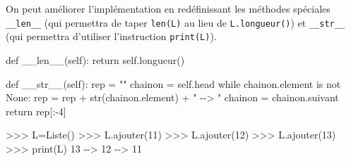 \documentclass[
  letterpaper,
  DIV=11,
  numbers=noendperiod]{scrartcl}
\newenvironment{Shaded}{\begin{snugshade}}{\end{snugshade}}
\newcommand{\BuiltInTok}[1]{\textcolor[rgb]{0.00,0.23,0.31}{#1}}
\newcommand{\ControlFlowTok}[1]{\textcolor[rgb]{0.00,0.23,0.31}{#1}}
\newcommand{\DecValTok}[1]{\textcolor[rgb]{0.68,0.00,0.00}{#1}}
\newcommand{\FunctionTok}[1]{\textcolor[rgb]{0.28,0.35,0.67}{#1}}
\newcommand{\KeywordTok}[1]{\textcolor[rgb]{0.00,0.23,0.31}{#1}}
\newcommand{\NormalTok}[1]{\textcolor[rgb]{0.00,0.23,0.31}{#1}}
\newcommand{\OperatorTok}[1]{\textcolor[rgb]{0.37,0.37,0.37}{#1}}
\newcommand{\StringTok}[1]{\textcolor[rgb]{0.13,0.47,0.30}{#1}}
\newcommand{\VariableTok}[1]{\textcolor[rgb]{0.07,0.07,0.07}{#1}}
\begin{document}
On peut améliorer l'implémentation en redéfinissant les méthodes
spéciales \texttt{\_\_len\_\_} (qui permettra de taper \texttt{len(L)}
au lieu de \texttt{L.longueur()}) et \texttt{\_\_str\_\_} (qui permettra
d'utiliser l'instruction \texttt{print(L)}).

\begin{Shaded}
\begin{Highlighting}[]
    \KeywordTok{def} \FunctionTok{\_\_len\_\_}\NormalTok{(}\VariableTok{self}\NormalTok{):}
        \ControlFlowTok{return} \VariableTok{self}\NormalTok{.longueur()}

    \KeywordTok{def} \FunctionTok{\_\_str\_\_}\NormalTok{(}\VariableTok{self}\NormalTok{):}
\NormalTok{        rep }\OperatorTok{=} \StringTok{""}
\NormalTok{        chainon }\OperatorTok{=} \VariableTok{self}\NormalTok{.head}
        \ControlFlowTok{while}\NormalTok{ chainon.element }\KeywordTok{is} \KeywordTok{not} \VariableTok{None}\NormalTok{:}
\NormalTok{            rep }\OperatorTok{=}\NormalTok{ rep }\OperatorTok{+} \BuiltInTok{str}\NormalTok{(chainon.element) }\OperatorTok{+} \StringTok{" {-}{-}\textgreater{} "}
\NormalTok{            chainon }\OperatorTok{=}\NormalTok{ chainon.suivant}
        \ControlFlowTok{return}\NormalTok{ rep[:}\OperatorTok{{-}}\DecValTok{4}\NormalTok{]}
\end{Highlighting}
\end{Shaded}

\begin{Shaded}
\begin{Highlighting}[]
\OperatorTok{\textgreater{}\textgreater{}\textgreater{}}\NormalTok{ L}\OperatorTok{=}\NormalTok{Liste()}
\OperatorTok{\textgreater{}\textgreater{}\textgreater{}}\NormalTok{ L.ajouter(}\DecValTok{11}\NormalTok{)}
\OperatorTok{\textgreater{}\textgreater{}\textgreater{}}\NormalTok{ L.ajouter(}\DecValTok{12}\NormalTok{)}
\OperatorTok{\textgreater{}\textgreater{}\textgreater{}}\NormalTok{ L.ajouter(}\DecValTok{13}\NormalTok{)}
\OperatorTok{\textgreater{}\textgreater{}\textgreater{}} \BuiltInTok{print}\NormalTok{(L)}
\DecValTok{13} \OperatorTok{{-}{-}\textgreater{}} \DecValTok{12} \OperatorTok{{-}{-}\textgreater{}} \DecValTok{11} 
\end{Highlighting}
\end{Shaded}
\end{document}
